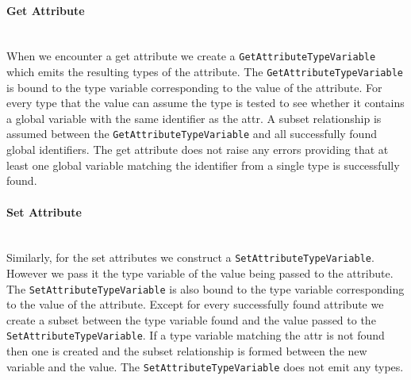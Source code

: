 \documentclass[12pt, titlepage]{article}
\begin{document}
\paragraph*{Get Attribute}\mbox{} \\
When we encounter a get attribute we create a \texttt{GetAttributeTypeVariable} which emits the resulting types of the attribute. The \texttt{GetAttributeTypeVariable} is bound to the type variable corresponding to the value of the attribute. For every type that the value can assume the type is tested to see whether it contains a global variable with the same identifier as the attr. A subset relationship is assumed between the \texttt{GetAttributeTypeVariable} and all successfully found global identifiers. The get attribute does not raise any errors providing that at least one global variable matching the identifier from a single type is successfully found.

\paragraph*{Set Attribute}\mbox{} \\
Similarly, for the set attributes we construct a \texttt{SetAttributeTypeVariable}. However we pass it the type variable of the value being passed to the attribute. The \texttt{SetAttributeTypeVariable} is also bound to the type variable corresponding to the value of the attribute. Except for every successfully found attribute we create a subset between the type variable found and the value passed to the \texttt{SetAttributeTypeVariable}. If a type variable matching the attr is not found then one is created and the subset relationship is formed between the new variable and the value. The \texttt{SetAttributeTypeVariable} does not emit any types.
\end{document}
